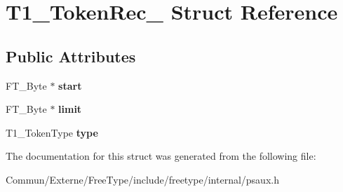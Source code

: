 \hypertarget{struct_t1___token_rec__}{}\section{T1\+\_\+\+Token\+Rec\+\_\+ Struct Reference}
\label{struct_t1___token_rec__}
\subsection*{Public Attributes}
\begin{DoxyCompactItemize}
\item 
F\+T\+\_\+\+Byte $\ast$ {\bfseries start}\hypertarget{struct_t1___token_rec___a1b365e2910220eabf05f925f45bc98d6}{}\label{struct_t1___token_rec___a1b365e2910220eabf05f925f45bc98d6}

\item 
F\+T\+\_\+\+Byte $\ast$ {\bfseries limit}\hypertarget{struct_t1___token_rec___aacd035f0dfbc47b7e1c7eefbe2c2080c}{}\label{struct_t1___token_rec___aacd035f0dfbc47b7e1c7eefbe2c2080c}

\item 
T1\+\_\+\+Token\+Type {\bfseries type}\hypertarget{struct_t1___token_rec___a88b3b889e74609be1827ead4093a2d52}{}\label{struct_t1___token_rec___a88b3b889e74609be1827ead4093a2d52}

\end{DoxyCompactItemize}


The documentation for this struct was generated from the following file\+:\begin{DoxyCompactItemize}
\item 
Commun/\+Externe/\+Free\+Type/include/freetype/internal/psaux.\+h\end{DoxyCompactItemize}
